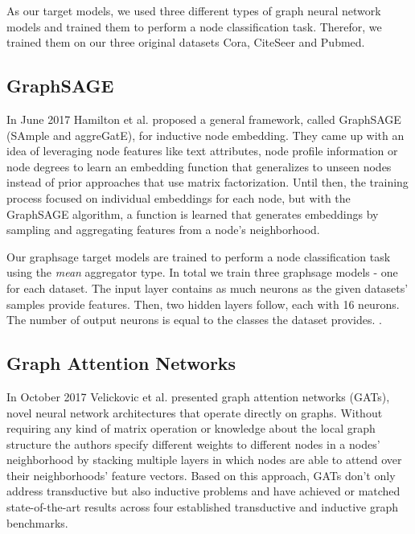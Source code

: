     As our target models, we used three different types of graph neural network models and trained them to perform a node classification task. 
    Therefor, we trained them on our three original datasets Cora, CiteSeer and Pubmed.

    \subsection*{GraphSAGE}
      In June 2017 Hamilton et al.\cite{hamilton2018inductive} proposed a general framework, called GraphSAGE (SAmple and aggreGatE), for inductive node embedding. 
      They came up with an idea of leveraging node features like text attributes, node profile information or node degrees to learn an embedding function that generalizes to unseen nodes instead of prior approaches that use matrix factorization.
      Until then, the training process focused on individual embeddings for each node, but with the GraphSAGE algorithm, a function is learned that generates embeddings by sampling and aggregating features from a node's neighborhood.

      Our graphsage target models are trained to perform a node classification task using the \emph{mean} aggregator type.
      In total we train three graphsage models - one for each dataset.
      The input layer contains as much neurons as the given datasets' samples provide features.
      Then, two hidden layers follow, each with 16 neurons.
      The number of output neurons is equal to the classes the dataset provides.
      .

    \subsection*{Graph Attention Networks}
      In October 2017 Velickovic et al.\cite{gat} presented graph attention networks (GATs), novel neural network architectures that operate directly on graphs.
      Without requiring any kind of matrix operation or knowledge about the local graph structure the authors specify different weights to different nodes in a nodes' neighborhood by stacking multiple layers in which nodes are able to attend over their neighborhoods' feature vectors.
      Based on this approach, GATs don't only address transductive but also inductive problems and have achieved or matched state-of-the-art results across four established transductive and inductive graph benchmarks.

